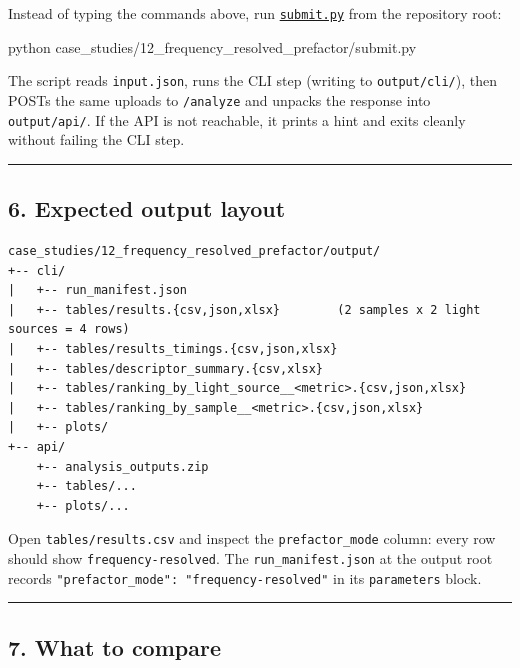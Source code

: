 \documentclass[
  11pt,
]{article}
\newenvironment{Shaded}{}{}
\newcommand{\ExtensionTok}[1]{#1}
\newcommand{\NormalTok}[1]{#1}
\begin{document}
Instead of typing the commands above, run
\href{https://github.com/pinarsyt/overlap-calculator/blob/main/case_studies/12_frequency_resolved_prefactor/submit.py}{\texttt{submit.py}}
from the repository root:

\begin{Shaded}
\begin{Highlighting}[]
\ExtensionTok{python}\NormalTok{ case\_studies/12\_frequency\_resolved\_prefactor/submit.py}
\end{Highlighting}
\end{Shaded}

The script reads \texttt{input.json}, runs the CLI step (writing to
\texttt{output/cli/}), then POSTs the same uploads to \texttt{/analyze}
and unpacks the response into \texttt{output/api/}. If the API is not
reachable, it prints a hint and exits cleanly without failing the CLI
step.

\begin{center}\rule{0.5\linewidth}{0.5pt}\end{center}

\hypertarget{6-expected-output-layout}{
\subsection{6. Expected output layout}\label{6-expected-output-layout}}

\begin{verbatim}
case_studies/12_frequency_resolved_prefactor/output/
+-- cli/
|   +-- run_manifest.json
|   +-- tables/results.{csv,json,xlsx}        (2 samples x 2 light sources = 4 rows)
|   +-- tables/results_timings.{csv,json,xlsx}
|   +-- tables/descriptor_summary.{csv,xlsx}
|   +-- tables/ranking_by_light_source__<metric>.{csv,json,xlsx}
|   +-- tables/ranking_by_sample__<metric>.{csv,json,xlsx}
|   +-- plots/
+-- api/
    +-- analysis_outputs.zip
    +-- tables/...
    +-- plots/...
\end{verbatim}

Open \texttt{tables/results.csv} and inspect the \texttt{prefactor\_mode}
column: every row should show \texttt{frequency-resolved}. The
\texttt{run\_manifest.json} at the output root records
\texttt{"prefactor\_mode":\ "frequency-resolved"} in its
\texttt{parameters} block.

\begin{center}\rule{0.5\linewidth}{0.5pt}\end{center}

\hypertarget{7-what-to-compare}{
\subsection{7. What to compare}\label{7-what-to-compare}}
\end{document}
